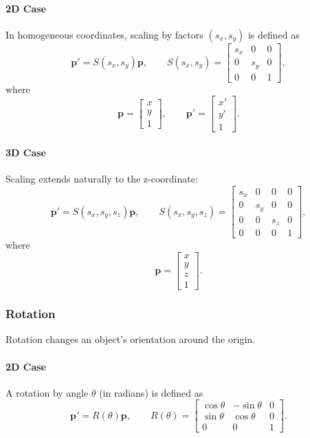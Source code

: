\paragraph{2D Case}
In homogeneous coordinates, scaling by factors $(s_x, s_y)$ is defined as
\[
\mathbf{p}' = S(s_x,s_y)\mathbf{p},
\qquad
S(s_x,s_y)=
\begin{bmatrix}
s_x & 0 & 0 \\
0 & s_y & 0 \\
0 & 0 & 1
\end{bmatrix},
\]
where
\[
\mathbf{p}=
\begin{bmatrix}
x\\y\\1
\end{bmatrix},
\qquad
\mathbf{p}'=
\begin{bmatrix}
x'\\y'\\1
\end{bmatrix}.
\]

\paragraph{3D Case}
Scaling extends naturally to the z-coordinate:
\[
\mathbf{p}' = S(s_x,s_y,s_z)\mathbf{p},
\qquad
S(s_x,s_y,s_z)=
\begin{bmatrix}
s_x & 0 & 0 & 0 \\
0 & s_y & 0 & 0 \\
0 & 0 & s_z & 0 \\
0 & 0 & 0 & 1
\end{bmatrix},
\]
where
\[
\mathbf{p}=
\begin{bmatrix}
x\\y\\z\\1
\end{bmatrix}.
\]

\subsubsection{Rotation}
Rotation changes an object's orientation around the origin.

\paragraph{2D Case}
A rotation by angle $\theta$ (in radians) is defined as
\[
\mathbf{p}' = R(\theta)\mathbf{p},
\qquad
R(\theta)=
\begin{bmatrix}
\cos\theta & -\sin\theta & 0 \\
\sin\theta & \cos\theta & 0 \\
0 & 0 & 1
\end{bmatrix}.
\]

